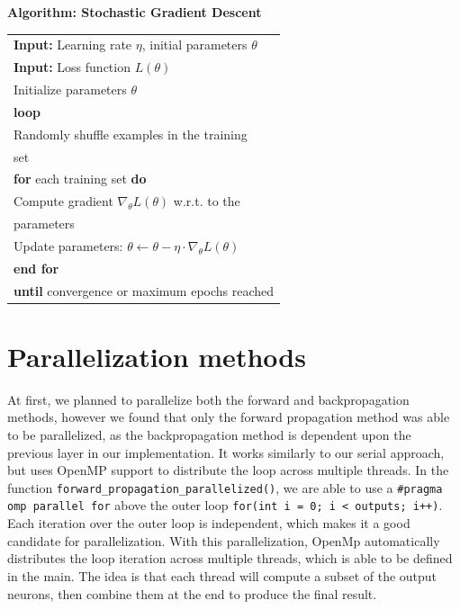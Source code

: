 \documentclass[12pt, twocolumn]{report}
\begin{document}
\begin{center}
\textbf{Algorithm: Stochastic Gradient Descent}\\
\begin{tabular}{l}
\textbf{Input:} Learning rate $\eta$, initial parameters $\theta$ \\
\textbf{Input:} Loss function $L(\theta)$ \\
Initialize parameters $\theta$ \\
\textbf{loop} \\
\quad Randomly shuffle examples in the training \\ 
\quad set \\
\quad \textbf{for} each training set \textbf{do} \\
\quad \quad Compute gradient $\nabla_\theta L(\theta)$ w.r.t. to the \\
\quad \quad parameters \\
\quad \quad Update parameters: $\theta \leftarrow \theta - \eta \cdot \nabla_\theta L(\theta)$ \\
\quad \textbf{end for} \\
\textbf{until} convergence or maximum epochs reached \\
\end{tabular}
\end{center}



\section*{Parallelization methods}
At first, we planned to parallelize both the forward and backpropagation methods, however we found that only the forward propagation
method was able to be parallelized, as the backpropagation method is dependent upon the previous layer in our implementation. It works similarly to our serial
approach, but uses OpenMP support to distribute the loop across multiple threads. In the function \texttt{forward\_propagation\_parallelized()}, we are able to use a
\texttt{\#pragma omp parallel for} above the outer loop \texttt{for(int i = 0; i < outputs; i++)}. Each iteration over the outer loop is independent, which makes it a
good candidate for parallelization. With this parallelization, OpenMp automatically distributes the loop iteration across multiple threads, which is able to be defined
in the main. The idea is that each thread will compute a subset of the output neurons, then combine them at the end to produce the final result.
\end{document}
